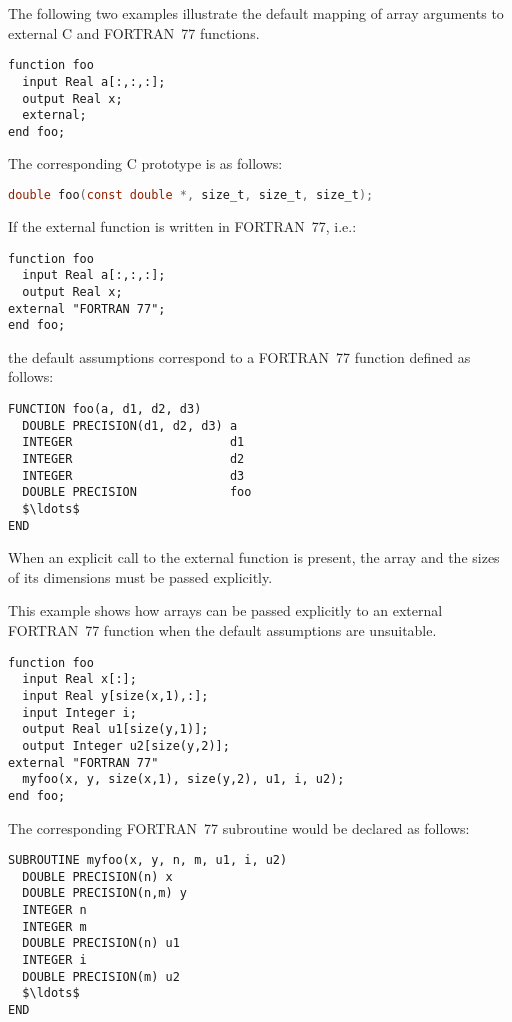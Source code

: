 \begin{example}
The following two examples illustrate the default mapping of array arguments to external C and FORTRAN~77 functions.

\begin{lstlisting}[language=modelica]
function foo
  input Real a[:,:,:];
  output Real x;
  external;
end foo;
\end{lstlisting}
The corresponding C prototype is as follows:
\begin{lstlisting}[language=C]
double foo(const double *, size_t, size_t, size_t);
\end{lstlisting}

If the external function is written in FORTRAN~77, i.e.:
\begin{lstlisting}[language=modelica]
function foo
  input Real a[:,:,:];
  output Real x;
external "FORTRAN 77";
end foo;
\end{lstlisting}
the default assumptions correspond to a FORTRAN~77 function defined as follows:
\begin{lstlisting}[language=FORTRAN77]
FUNCTION foo(a, d1, d2, d3)
  DOUBLE PRECISION(d1, d2, d3) a
  INTEGER                      d1
  INTEGER                      d2
  INTEGER                      d3
  DOUBLE PRECISION             foo
  $\ldots$
END
\end{lstlisting}
\end{example}

When an explicit call to the external function is present, the array and the sizes of its dimensions must be passed explicitly.

\begin{example}
This example shows how arrays can be passed explicitly to an external FORTRAN~77 function when the default assumptions are unsuitable.

\begin{lstlisting}[language=modelica]
function foo
  input Real x[:];
  input Real y[size(x,1),:];
  input Integer i;
  output Real u1[size(y,1)];
  output Integer u2[size(y,2)];
external "FORTRAN 77"
  myfoo(x, y, size(x,1), size(y,2), u1, i, u2);
end foo;
\end{lstlisting}
The corresponding FORTRAN~77 subroutine would be declared as follows:
\begin{lstlisting}[language=FORTRAN77]
SUBROUTINE myfoo(x, y, n, m, u1, i, u2)
  DOUBLE PRECISION(n) x
  DOUBLE PRECISION(n,m) y
  INTEGER n
  INTEGER m
  DOUBLE PRECISION(n) u1
  INTEGER i
  DOUBLE PRECISION(m) u2
  $\ldots$
END
\end{lstlisting}
\end{example}

